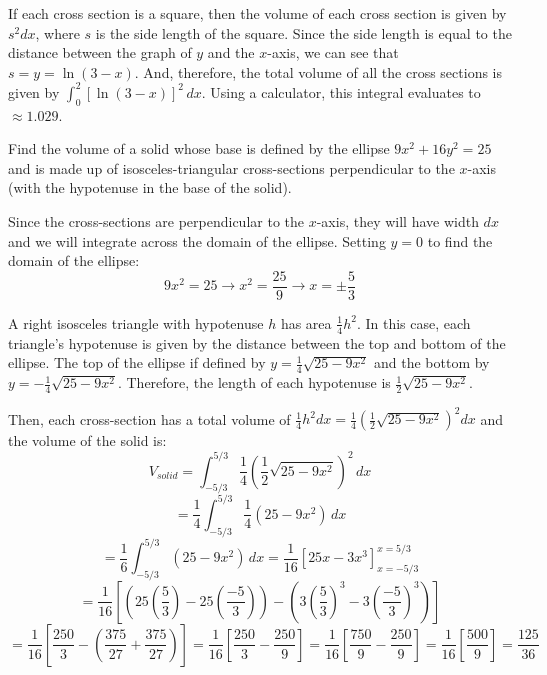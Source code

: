 \begin{Answer}[ref=AP_87]
If each cross section is a square, then the volume of each cross section is 
given by $s^2 dx$, where $s$ is the side length of the square. Since the side 
length is equal to the distance between the graph of $y$ and the $x$-axis, we 
can see that $s = y = \ln{(3 - x)}$. And, therefore, the total volume of all 
the cross sections is given by $\int_0^2 \left[\ln{(3 - x)} \right]^2\,dx$. 
Using a calculator, this integral evaluates to $\approx 1.029$. 
\end{Answer}

\begin{Exercise}[label = volume6]
Find the volume of a solid whose base is defined by the ellipse $9x^2 + 16y^2 =
25$ and is made up of isosceles-triangular cross-sections perpendicular to the 
$x$-axis (with the hypotenuse in the base of the solid). 
\vspace{40mm}
\end{Exercise}

\begin{Answer}[ref = volume6]
Since the cross-sections are perpendicular to the $x$-axis, they will have 
width $dx$ and we will integrate across the domain of the ellipse. Setting $y =
0$ to find the domain of the ellipse:
$$9x^2 = 25 \to x^2 = \frac{25}{9} \to x = \pm \frac{5}{3}$$

A right isosceles triangle with hypotenuse $h$ has area $\frac{1}{4}h^2$. In 
this case, each triangle's hypotenuse is given by the distance between the top 
and bottom of the ellipse. The top of the ellipse if defined by $y = \frac{1}{4
} \sqrt{25 - 9x^2}$ and the bottom by $y = -\frac{1}{4} \sqrt{25 - 9x^2}$. 
Therefore, the length of each hypotenuse is $\frac{1}{2}\sqrt{25-9x^2}$. 

Then, each cross-section has a total volume of $\frac{1}{4}h^2 dx = \frac{1}{4}
\left( \frac{1}{2} \sqrt{25 - 9x^2} \right)^2 dx$ and the volume of the solid 
is:
$$V_{solid} = \int_{-5/3}^{5/3} \frac{1}{4} \left( \frac{1}{2} \sqrt{25 - 9x^2}
\right)^2 \, dx$$
$$= \frac{1}{4} \int_{-5/3}^{5/3} \frac{1}{4} \left( 25 - 9x^2 \right) \, dx$$
$$= \frac{1}{6} \int_{-5/3}^{5/3} \left( 25 - 9x^2 \right) \, dx = \frac{1}{16}
\left[ 25x - 3x^3 \right]_{x = -5/3}^{x = 5/3}$$
$$= \frac{1}{16} \left[ \left( 25 \left( \frac{5}{3} \right) - 25 \left( \frac{
-5}{3} \right) \right) - \left( 3 \left( \frac{5}{3} \right)^3 - 3 \left( 
\frac{-5}{3} \right)^3 \right) \right]$$
$$= \frac{1}{16} \left[ \frac{250}{3} - \left( \frac{375}{27} + \frac{375}{27} 
\right) \right] = \frac{1}{16} \left[ \frac{250}{3} - \frac{250}{9}\right] = 
\frac{1}{16} \left[  \frac{750}{9} - \frac{250}{9} \right] = \frac{1}{16} 
\left[ \frac{500}{9} \right] = \frac{125}{36}$$
\end{Answer}

